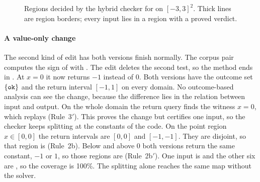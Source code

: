 \begin{figure}
  \centering
  \caption{Regions decided by the hybrid checker for  on $[-3,3]^2$. Thick lines
  are region borders; every input lies in a region with a proved verdict.}
  \label{fig:ratio}
\end{figure}

\paragraph{A value-only change}
The second kind of edit has both versions finish normally. The corpus pair 
computes the sign of  with .
The edit deletes the second test, so the method ends in . At $x = 0$ it now
returns $-1$ instead of $0$. Both versions have the outcome set $\left\{\texttt{ok}\right\}$ and the return
interval $[-1,1]$ on every domain. No outcome-based analysis can see the change, because the
difference lies in the relation between input and output. On the whole domain the return query
finds the witness $x = 0$, which replays (Rule~3$'$). This proves the change but certifies one
input, so the checker keeps splitting at the constants of the code. On the point region
$x \in [0,0]$ the return intervals are $[0,0]$ and $[-1,-1]$. They are disjoint, so that region
is \chg{} (Rule~2b). Below and above $0$ both versions return the same constant, $-1$ or $1$,
so those regions are \pres{} (Rule~2b$'$). One input is \chg{} and the other six are \pres{}, so
the coverage is 100\%. The splitting alone reaches the same map without the solver.
